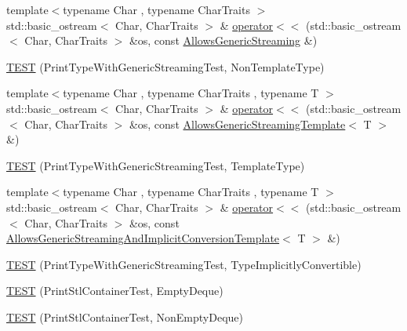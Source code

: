 \begin{DoxyCompactItemize}
\item 
{\footnotesize template$<$typename Char , typename Char\+Traits $>$ }\\std\+::basic\+\_\+ostream$<$ Char, Char\+Traits $>$ \& \hyperlink{namespacetesting_1_1gtest__printers__test_a1eb0213095e639d357692066e8505887}{operator$<$$<$} (std\+::basic\+\_\+ostream$<$ Char, Char\+Traits $>$ \&os, const \hyperlink{classtesting_1_1gtest__printers__test_1_1AllowsGenericStreaming}{Allows\+Generic\+Streaming} \&)
\item 
\hyperlink{namespacetesting_1_1gtest__printers__test_a9272037c799c4779e1d79476dad66cb6}{T\+E\+ST} (Print\+Type\+With\+Generic\+Streaming\+Test, Non\+Template\+Type)
\item 
{\footnotesize template$<$typename Char , typename Char\+Traits , typename T $>$ }\\std\+::basic\+\_\+ostream$<$ Char, Char\+Traits $>$ \& \hyperlink{namespacetesting_1_1gtest__printers__test_a5464168e925b1adf29986c8e544e908e}{operator$<$$<$} (std\+::basic\+\_\+ostream$<$ Char, Char\+Traits $>$ \&os, const \hyperlink{classtesting_1_1gtest__printers__test_1_1AllowsGenericStreamingTemplate}{Allows\+Generic\+Streaming\+Template}$<$ T $>$ \&)
\item 
\hyperlink{namespacetesting_1_1gtest__printers__test_a6e180c85f307712a995985f7bc735fd1}{T\+E\+ST} (Print\+Type\+With\+Generic\+Streaming\+Test, Template\+Type)
\item 
{\footnotesize template$<$typename Char , typename Char\+Traits , typename T $>$ }\\std\+::basic\+\_\+ostream$<$ Char, Char\+Traits $>$ \& \hyperlink{namespacetesting_1_1gtest__printers__test_a09eedfbca613302efe6438d2a537f419}{operator$<$$<$} (std\+::basic\+\_\+ostream$<$ Char, Char\+Traits $>$ \&os, const \hyperlink{classtesting_1_1gtest__printers__test_1_1AllowsGenericStreamingAndImplicitConversionTemplate}{Allows\+Generic\+Streaming\+And\+Implicit\+Conversion\+Template}$<$ T $>$ \&)
\item 
\hyperlink{namespacetesting_1_1gtest__printers__test_a68877c5e1ec7a53281798310c30e1776}{T\+E\+ST} (Print\+Type\+With\+Generic\+Streaming\+Test, Type\+Implicitly\+Convertible)
\item 
\hyperlink{namespacetesting_1_1gtest__printers__test_a1ce10b8a3634e0f6bfbfbb5888c04a95}{T\+E\+ST} (Print\+Stl\+Container\+Test, Empty\+Deque)
\item 
\hyperlink{namespacetesting_1_1gtest__printers__test_a249d482cf4a1525bd043489dcbd3e200}{T\+E\+ST} (Print\+Stl\+Container\+Test, Non\+Empty\+Deque)

\end{DoxyCompactItemize}

